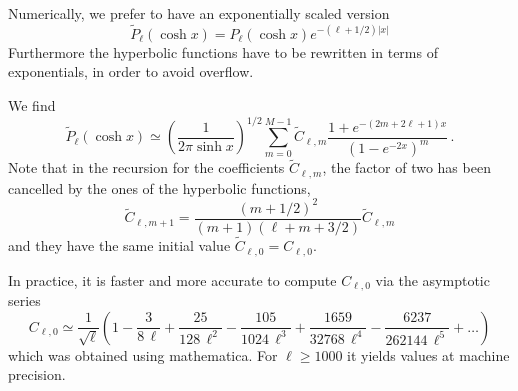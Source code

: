 \documentclass[onecolumn%
              ,superscriptaddress%
              ,aps%
              ,pra]{revtex4}
\begin{document}
Numerically, we prefer to have an exponentially scaled version
\begin{equation}
\tilde P_\ell(\cosh x) = P_\ell(\cosh x) e^{-(\ell+1/2)\vert x\vert}
\end{equation} Furthermore the hyperbolic functions have to be rewritten in terms of exponentials, in order to avoid overflow.

We find
\begin{equation}
\tilde P_\ell(\cosh x) \simeq \left(\frac{1}{2\pi \sinh x}\right)^{1/2} \sum_{m=0}^{M-1} \tilde{C}_{\ell, m} \frac{1+e^{-(2m+2\ell+1)x}}{(1-e^{-2x})^m}\,.
\end{equation}
Note that in the recursion for the coefficients $\tilde{C}_{\ell,m}$, the factor of two has been cancelled by the ones of the hyperbolic functions,
\begin{equation}
\tilde C_{\ell,m+1} = \frac{(m+1/2)^2}{(m+1)(\ell+m+3/2)} \tilde C_{\ell,m}
\end{equation}
and they have the same initial value $\tilde C_{\ell,0} = C_{\ell,0}$.

In practice, it is faster and more accurate to compute $C_{\ell,0}$ via the asymptotic series
\begin{equation}
C_{\ell,0} \simeq \frac{1}{\sqrt{\ell}}\left(1-\frac{3}{8\,\ell}+\frac{25}{128\,\ell^2} - \frac{105}{1024\,\ell^3} + \frac{1659}{32768\,\ell^4} - \frac{6237}{262144\,\ell^5}+ \dots\right)
\end{equation}
which was obtained using mathematica.
For $\ell\geq 1000$ it yields values at machine precision.
\end{document}
